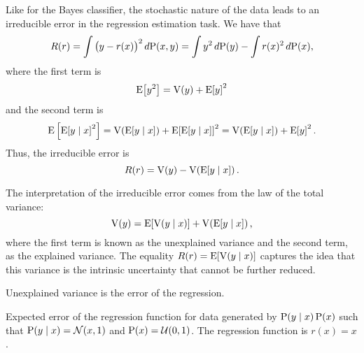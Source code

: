 Like for the Bayes classifier, the stochastic nature of the data leads to an irreducible
error in the regression estimation task.  We have that
\begin{equation*}
  R(r) = \int \big(y - r(x)\big)^2\, d\!\operatorname{P}(x, y) =
    \int y^2\, d\!\operatorname{P}(y) - \int r(x)^2\, d\!\operatorname{P}(x)\text{,}
\end{equation*}
where the first term is
\[
  \operatorname{E}\!\left[y^2\right] = \operatorname{V}(y) + \operatorname{E}\!\left[y\right]^2
\]
and the second term is
\[
  \E\left[\E\!\left[y \mid x\right]^2\right] =
    \Var\!\left(\E\!\left[y \mid x\right]\right) + \E\!\left[\E\!\left[y \mid x\right]\right]^2 =
    \Var\!\left(\E\!\left[y \mid x\right]\right) + \E\!\left[y\right]^2\text{.}
\]
Thus, the irreducible error is
\[
  R(r) = \operatorname{V}(y) - \operatorname{V}\!\left(\operatorname{E}\!\left[y \mid x\right]\right) \text{.}
\]

The interpretation of the irreducible error comes from the law of the total variance:
\begin{equation*}
  \operatorname{V}(y) = \operatorname{E}\!\left[ \operatorname{V}(y \mid x) \right] + \operatorname{V}\!\left(\operatorname{E}\!\left[y \mid x\right]\right)\text{,}
\end{equation*}
where the first term is known as the unexplained variance and the second term, as the
explained variance.  The equality $R(r) = \operatorname{E}\!\left[ \operatorname{V}(y \mid x) \right]$
captures the idea that this variance is the intrinsic uncertainty that cannot be further
reduced.

\begin{figurebox}[label=fig:explained-unexplained-variance]{Unexplained variance is the
  error of the regression.}
  \centering
  \tcblower
  Expected error of the regression function for data generated by
  $\operatorname{P}(y \mid x) \operatorname{P}(x)$ such that $\operatorname{P}(y \mid x) = \mathcal{N}(x, 1)$ and
  $\operatorname{P}(x) = \mathcal{U}(0, 1)$.  The regression function is $r(x) = x$.
\end{figurebox}

